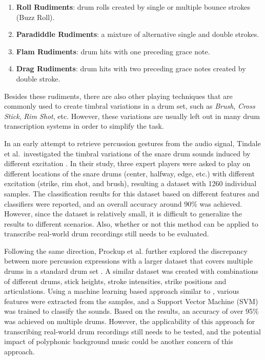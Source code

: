 \documentclass{article}
\begin{document}
\begin{enumerate}
	\item \textbf{Roll Rudiments}: drum rolls created by single or multiple bounce strokes (Buzz Roll).
	\item \textbf{Paradiddle Rudiments}: a mixture of alternative single and double strokes. 
	\item \textbf{Flam Rudiments}: drum hits with one preceding grace note.
	\item \textbf{Drag Rudiments}: drum hits with two preceding grace notes created by double stroke.
\end{enumerate}

Besides these rudiments, there are also other playing techniques that are commonly used to create timbral variations in a drum set, such as \textit{Brush}, \textit{Cross Stick}, \textit{Rim Shot}, etc. However, these variations are usually left out in many drum transcription systems \cite{Benetos2014, Dittmar2014, Thompson2014, Roebel2015, Wu2015a} in order to simplify the task. 

In an early attempt to retrieve percussion gestures from the audio signal, Tindale et al.~investigated the timbral variations of the snare drum sounds induced by different excitation \cite{Tindale2004}. In their study, three expert players were asked to play on different locations of the snare drums (center, halfway, edge, etc.) with different excitation (strike, rim shot, and brush), resulting a dataset with 1260 individual samples. The classification results for this dataset based on different features and classifiers were reported, and an overall accuracy around 90\% was achieved. However, since the dataset is relatively small, it is difficult to generalize the results to different scenarios. Also, whether or not this method can be applied to transcribe real-world drum recordings still needs to be evaluated. 

Following the same direction, Prockup et al. further explored the discrepancy between more percussion expressions with a larger dataset that covers multiple drums in a standard drum set \cite{Prockup2013}. A similar dataset was created with combinations of different drums, stick heights, stroke intensities, strike positions and articulations. Using a machine learning based approach similar to \cite{Tindale2004}, various features were extracted from the samples, and a Support Vector Machine (SVM) was trained to classify the sounds. Based on the results, an accuracy of over 95\% was achieved on multiple drums. However, the applicability of this approach for transcribing real-world drum recordings still needs to be tested, and the potential impact of polyphonic background music could be another concern of this approach.
 
\end{document}
